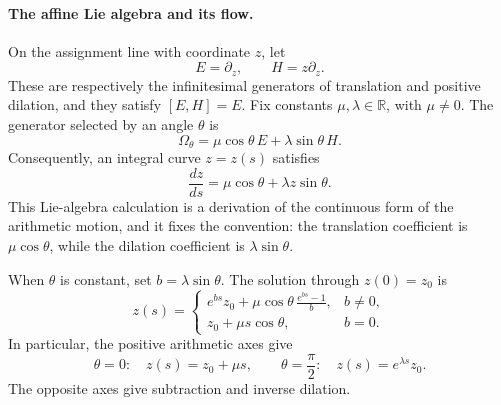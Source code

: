 \paragraph{The affine Lie algebra and its flow.}
On the assignment line with coordinate $z$, let
\[
 E=\partial_z,
 \qquad
 H=z\partial_z .
\]
These are respectively the infinitesimal generators of translation and positive
dilation, and they satisfy $[E,H]=E$.  Fix constants
$\mu,\lambda\in\mathbb R$, with $\mu\ne0$.  The generator selected by an angle
$\theta$ is
\begin{equation}\label{eq:angular-affine-generator}
 \Omega_\theta
 =\mu\cos\theta\,E+\lambda\sin\theta\,H .
\end{equation}
Consequently, an integral curve $z=z(s)$ satisfies
\begin{equation}\label{eq:continuous-affine-flow}
 \frac{dz}{ds}
 =\mu\cos\theta+\lambda z\sin\theta .
\end{equation}
This Lie-algebra calculation is a derivation of the continuous form of the
arithmetic motion, and it fixes the convention: the translation coefficient is
$\mu\cos\theta$, while the dilation coefficient is $\lambda\sin\theta$.

When $\theta$ is constant, set $b=\lambda\sin\theta$.  The solution through
$z(0)=z_0$ is
\begin{equation}\label{eq:directional-affine-solution}
 z(s)=
 \begin{cases}
  e^{bs}z_0+\displaystyle\mu\cos\theta\,\frac{e^{bs}-1}{b},
     & b\ne0,\\[7pt]
  z_0+\mu s\cos\theta, & b=0.
 \end{cases}
\end{equation}
In particular, the positive arithmetic axes give
\[
 \theta=0:\quad z(s)=z_0+\mu s,
 \qquad
 \theta=\frac{\pi}{2}:\quad z(s)=e^{\lambda s}z_0.
\]
The opposite axes give subtraction and inverse dilation.


